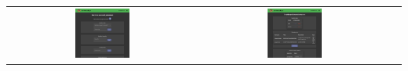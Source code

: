 \begin{tabular}{ccc}
	\includegraphics[width=0.3\textwidth]{assets/img/screenshots/13-gestione_account.png} &
	\includegraphics[width=0.3\textwidth]{assets/img/screenshots/14-dashboard.png} &
\end{tabular}